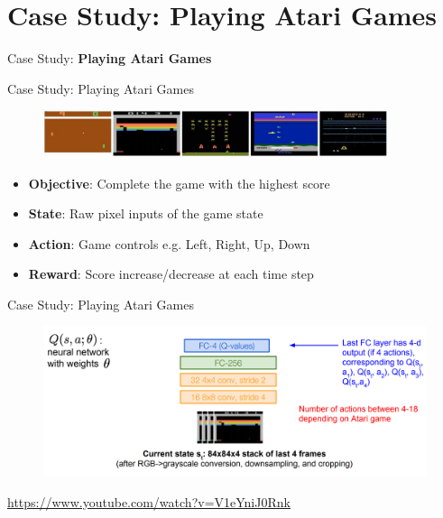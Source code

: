 \section{Case Study: Playing Atari Games}
\begin{frame}{}
    \LARGE Case Study: \textbf{Playing Atari Games}
\end{frame}

\begin{frame}{Case Study: Playing Atari Games}
\begin{figure}
\centering
\includegraphics[width=0.9\textwidth,height=0.9\textheight,keepaspectratio]{images/dqn+sarsa/atari_1.png}
\end{figure}

\begin{itemize}
    \item \textbf{Objective}: Complete the game with the highest score
    \item \textbf{State}: Raw pixel inputs of the game state
    \item \textbf{Action}: Game controls e.g. Left, Right, Up, Down
    \item \textbf{Reward}: Score increase/decrease at each time step
\end{itemize}

\end{frame}

\begin{frame}{Case Study: Playing Atari Games}

\begin{figure}
\centering
\includegraphics[width=1.0\textwidth,height=1.0\textheight,keepaspectratio]{images/dqn+sarsa/atari_2.png}
\end{figure}
\pause
\centering
\href{https://www.youtube.com/watch?v=V1eYniJ0Rnk}{https://www.youtube.com/watch?v=V1eYniJ0Rnk}

\end{frame}